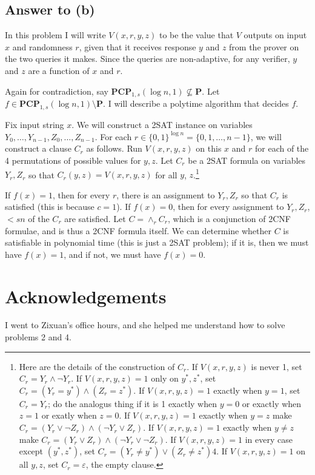 \documentclass{article}
\renewcommand{\P}{\mathbf{P}}
\def \eps {{\varepsilon}}
\begin{document}
\subsection*{Answer to (b)}
In this problem I will write $V(x, r, y, z)$ to be the value that $V$ outputs on input $x$ and randomness $r$, given that it receives response $y$ and $z$ from the prover on the two queries it makes.  Since the queries are non-adaptive, for any verifier, $y$ and $z$ are a function of $x$ and $r$.

Again for contradiction, say $\mathbf{PCP}_{1, s}(\log n, 1) \not\subseteq \P$.
Let $f \in \mathbf{PCP}_{1, s}(\log n, 1) \setminus \P$.
I will describe a polytime algorithm that decides $f$.

Fix input string $x$.
We will construct a 2SAT instance on variables $Y_0, \dots, Y_{n-1}, Z_0, \dots, Z_{n-1}$.
For each $r \in \{0, 1\}^{\log n} = \{0, 1, \dots, n-1\}$, we will construct a clause
$C_r$ as follows.
Run $V(x, r, y, z)$ on this $x$ and $r$ for each of the 4 permutations of possible
values for $y, z$.
Let $C_r$ be a 2SAT formula on variables $Y_r, Z_r$ so that $C_r(y, z) = V(x, r, y, z)$ for all $y$, $z$.\footnote{
Here are the details of the construction of $C_r$.
If $V(x, r, y, z)$ is never 1, set $C_r = Y_r \wedge \neg Y_r$.
If $V(x, r, y, z) = 1$ only on $y^*, z^*$, set $C_r = (Y_r = y^*) \wedge (Z_r = z^*)$.
If $V(x, r, y, z) = 1$ exactly when $y = 1$, set $C_r = Y_r$; do the analogus thing if it is 1 exactly when $y = 0$ or exactly when $z = 1$ or exatly when $z = 0$.
If $V(x, r, y, z) = 1$ exactly when $y = z$ make $C_r = (Y_r \vee \neg Z_r) \wedge (\neg Y_r \vee Z_r)$.
If $V(x, r, y, z) = 1$ exactly when $y \neq z$ make $C_r = (Y_r \vee Z_r) \wedge (\neg Y_r \vee \neg Z_r)$.
If $V(x, r, y, z) = 1$ in every case except $(y^*, z^*)$, set $C_r = (Y_r \neq y^*) \vee (Z_r \neq z^*)4$.
If $V(x, r, y, z) = 1$ on all $y, z$, set $C_r = \eps$, the empty clause.
}

If $f(x) = 1$, then for every $r$, there is an assignment to $Y_r, Z_r$ so that $C_r$ is satisfied (this is because $c = 1$).
If $f(x) = 0$, then for every assignment to $Y_r, Z_r$,
$< sn$ of the $C_r$ are satisfied.
Let $C = \wedge_{r} C_r$, which is a conjunction of 2CNF formulae, and is thus a 2CNF formula itself.
We can determine whether $C$ is satisfiable in polynomial time (this is just a 2SAT problem); if it is, then we must have $f(x) = 1$, and if not, we must have $f(x) = 0$.

\newpage
\section*{Acknowledgements}
I went to Zixuan's office hours, and she helped me understand how to solve problems 2 and 4.
\end{document}
